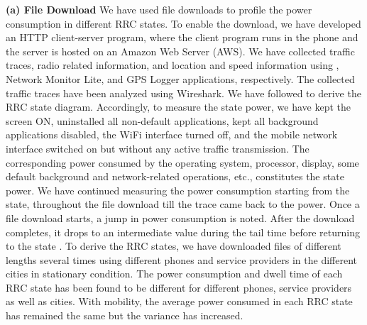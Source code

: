 {\textbf{(a) File Download}} We have used file downloads to profile the power consumption in different RRC states. To enable the download, we have developed  an HTTP client-server program, where the client program runs in the phone and the server  is hosted on an Amazon Web Server (AWS). We have collected traffic traces, radio related information, and location and speed information using , Network Monitor Lite, and GPS Logger applications, respectively. The collected traffic traces have been analyzed using Wireshark. We have followed \cite{Yang2018} to derive  the RRC state diagram. Accordingly, to measure the  state power, we have kept the screen ON, uninstalled all non-default applications, kept all background applications disabled, the WiFi interface turned off, and the mobile network interface switched on but without any active traffic transmission. The corresponding power consumed by the operating system, processor, display, some default background and network-related operations, etc., constitutes the  state power.  We have continued measuring the power consumption starting from the  state, throughout the file download till the trace came back to the  power. Once a file download starts, a jump in power consumption is noted. After the download completes, it drops to an intermediate value during the tail time before returning to the  state \cite{Yang2018}. To derive the RRC states, we have downloaded files of different lengths several times using different phones and service providers  in the different cities in stationary condition. The power consumption and dwell time of each RRC state has been found to be different for different phones, service providers as well as cities. With mobility, the average power consumed in each RRC state has remained the same but the variance has increased.\\
